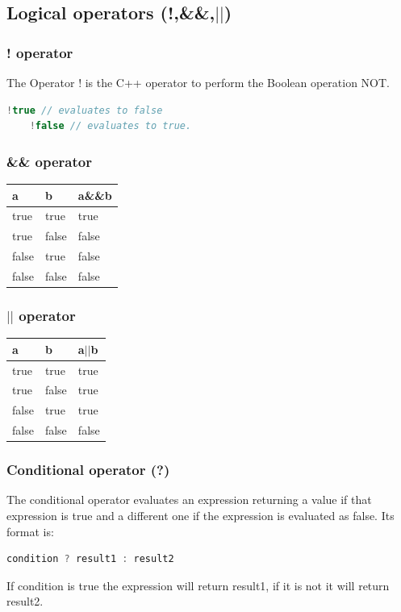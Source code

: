 \documentclass[12pt,oneside]{book}
\begin{document}
\subsection{Logical operators (!,\&\&,$||$)}
\subsubsection{! operator}
The Operator ! is the C++ operator to perform the Boolean operation NOT.
	\begin{lstlisting}[language=C++]
    !true // evaluates to false
    !false // evaluates to true. 
\end{lstlisting}
\subsubsection{\&\& operator}
\begin{center}
	\begin{tabular}{|l|l|l|}
		\hline
		a     & b     & a\&\&b \\ \hline
		true  & true  & true   \\ \hline
		true  & false & false  \\ \hline
		false & true  & false  \\ \hline
		false & false & false  \\ \hline
	\end{tabular}
\end{center}
\subsubsection{$||$ operator}
\begin{center}
	\begin{tabular}{|l|l|l|}
		\hline
		a     & b     & a$||$b \\ \hline
		true  & true  & true   \\ \hline
		true  & false & true   \\ \hline
		false & true  & true   \\ \hline
		false & false & false  \\ \hline
	\end{tabular}
\end{center}
\subsubsection{Conditional operator (?)}
The conditional operator evaluates an expression returning a value if that expression is true and a different one if the expression is evaluated as false. Its format is:
\begin{lstlisting}[language=C++]
    condition ? result1 : result2
\end{lstlisting}
If condition is true the expression will return result1, if it is not it will return result2.
\end{document}
